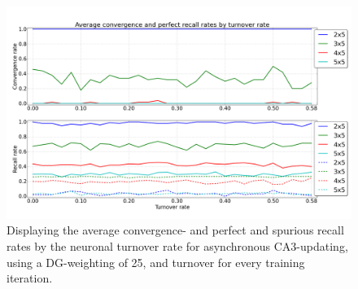 \begin{figure}
    \centering
    \includegraphics[width=13cm]{fig/turnover_rates/async_tm1_dgw1}
    \caption{Displaying the average convergence- and perfect and spurious recall rates by the neuronal turnover rate for asynchronous CA3-updating, using a DG-weighting of 25, and turnover for every training iteration.}
    \label{fig:async_tm1_dgw1}
\end{figure}